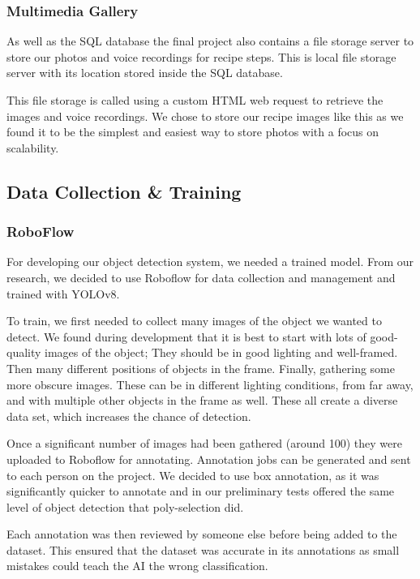 \documentclass{article}
\begin{document}
    \subsubsection{Multimedia Gallery}\label{multimediaGallery}
    As well as the SQL database the final project also contains a file storage server to store our photos and voice recordings for recipe steps. This is local file storage server with its location stored inside the SQL database.
    
    This file storage is called using a custom HTML web request to retrieve the images and voice recordings. We chose to store our recipe images like this as we found it to be the simplest and easiest way to store photos with a focus on scalability.

    \subsection{Data Collection \& Training}
    \subsubsection{RoboFlow}
    For developing our object detection system, we needed a trained model. From our research, we decided to use Roboflow for data collection and management and trained with YOLOv8.
    
To train, we first needed to collect many images of the object we wanted to detect. We found during development that it is best to start with lots of good-quality images of the object; They should be in good lighting and well-framed. Then many different positions of objects in the frame. Finally, gathering some more obscure images. These can be in different lighting conditions, from far away, and with multiple other objects in the frame as well. These all create a diverse data set, which increases the chance of detection.

Once a significant number of images had been gathered (around 100) they were uploaded to Roboflow for annotating. Annotation jobs can be generated and sent to each person on the project. We decided to use box annotation, as it was significantly quicker to annotate and in our preliminary tests offered the same level of object detection that poly-selection did.

Each annotation was then reviewed by someone else before being added to the dataset. This ensured that the dataset was accurate in its annotations as small mistakes could teach the AI the wrong classification.
\end{document}
